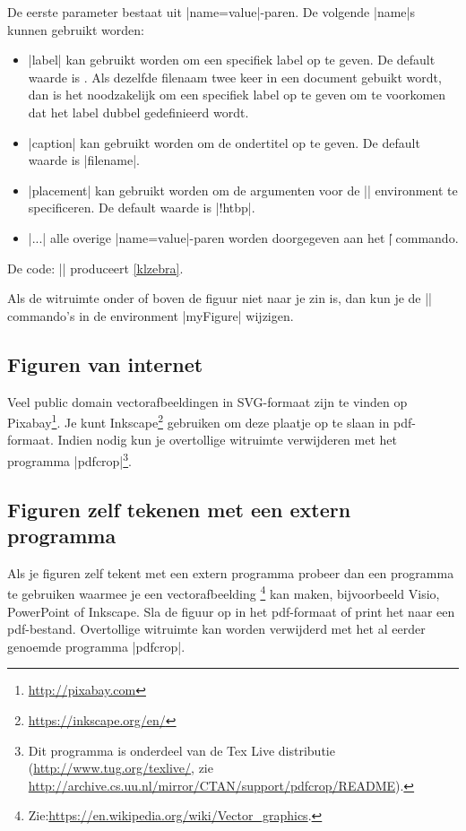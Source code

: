 De eerste parameter bestaat uit |name=value|-paren.
De volgende |name|s kunnen gebruikt worden:
\begin{itemize}
	\item |label| kan gebruikt worden om een specifiek label op te geven. De default waarde is {\lstllabel{}}. 
	Als dezelfde filenaam twee keer in een document gebuikt wordt, dan is het noodzakelijk om een specifiek label op te geven om te voorkomen dat het label {\lstllabel{}} dubbel gedefinieerd wordt.
	\item |caption| kan gebruikt worden om de ondertitel op te geven. De default waarde is |filename|.  
	\item |placement| kan gebruikt worden om de  argumenten voor de |\figure| environment te specificeren.
	De default waarde is |!htbp|.
	\item |...| alle overige |name=value|-paren worden doorgegeven aan het |\|{\lstlcs{}} commando.
\end{itemize} 

De code: || produceert \cref{klzebra}.


Als de witruimte onder of boven de figuur niet naar je zin is, dan kun je de |\vspace| commando's in de environment |myFigure| wijzigen.

\subsection{Figuren van internet} 
Veel public domain vectorafbeeldingen in SVG\hyp{}formaat zijn te vinden op Pixabay\footnote{\url{http://pixabay.com}}.
Je kunt Inkscape\footnote{\url{https://inkscape.org/en/}} gebruiken om deze plaatje op te slaan in pdf\hyp{}formaat.
Indien nodig kun je overtollige witruimte verwijderen met het programma |pdfcrop|\footnote{Dit programma is onderdeel van de Tex Live distributie (\url{http://www.tug.org/texlive/},
zie \url{http://archive.cs.uu.nl/mirror/CTAN/support/pdfcrop/README}).}.

\subsection{Figuren zelf tekenen met een extern programma}
Als je figuren zelf tekent met een extern programma probeer dan een programma te gebruiken waarmee je een vectorafbeelding%
\footnote{Zie:\url{https://en.wikipedia.org/wiki/Vector_graphics}.}
kan maken, bijvoorbeeld Visio, PowerPoint of Inkscape.
Sla de figuur op in het pdf-formaat of print het naar een pdf-bestand.
Overtollige witruimte kan worden verwijderd met het al eerder genoemde programma |pdfcrop|.

